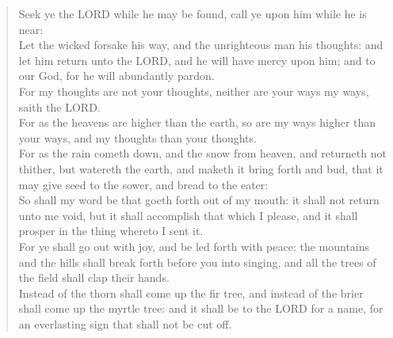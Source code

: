 \documentclass[MAIN]{subfiles}
\begin{document}
\begin{verse}
Seek ye the {\hge LORD} while he may be found, call ye upon him while he is near:\\
Let the wicked forsake his way, and the unrighteous man his thoughts: and let him return unto the {\hge LORD}, and he will have mercy upon him; and to our God, for he will abundantly pardon.\\
For my thoughts are not your thoughts, neither are your ways my ways, saith the {\hge LORD}.\\
For as the heavens are higher than the earth, so are my ways higher than your ways, and my thoughts than your thoughts.\\
For as the rain cometh down, and the snow from heaven, and returneth not thither, but watereth the earth, and maketh it bring forth and bud, that it may give seed to the sower, and bread to the eater:\\
So shall my word be that goeth forth out of my mouth: it shall not return unto me void, but it shall accomplish that which I please, and it shall prosper in the thing whereto I sent it.\\
For ye shall go out with joy, and be led forth with peace: the mountains and the hills shall break forth before you into singing, and all the trees of the field shall clap their hands.\\
Instead of the thorn shall come up the fir tree, and instead of the brier shall come up the myrtle tree: and it shall be to the {\hge LORD} for a name, for an everlasting sign that shall not be cut off.
\end{verse}
\end{document}
